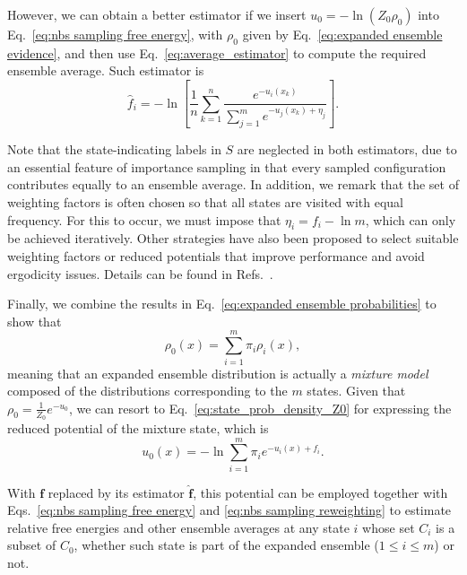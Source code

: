 \documentclass[aip,jcp,reprint,amsmath,amssymb]{revtex4-1}
\newcommand{\vt}[1]{\boldsymbol{\mathbf{#1}}}           %
\begin{document}
However, we can obtain a better estimator if we insert $u_0 = -\ln(Z_0\rho_0)$ into Eq.~\eqref{eq:nbs sampling free energy}, with $\rho_0$ given by Eq.~\eqref{eq:expanded ensemble evidence}, and then use Eq.~\eqref{eq:average_estimator} to compute the required ensemble average. Such estimator is
\begin{equation}
\label{eq:expanded ensemble FEP estimator}
\hat f_i = -\ln \left[ \frac{1}{n}\sum_{k=1}^n \frac{e^{-u_i(x_k)}}{\sum_{j=1}^m e^{-u_j(x_k) + \eta_j}} \right].
\end{equation}

Note that the state-indicating labels in $S$ are neglected in both estimators, due to an essential feature of importance sampling in that every sampled configuration contributes equally to an ensemble average. In addition, we remark that the set of weighting factors is often chosen so that all states are visited with equal frequency. For this to occur, we must impose that $\eta_i = f_i - \ln m$, which can only be achieved iteratively. Other strategies have also been proposed to select suitable weighting factors or reduced potentials that improve performance and avoid ergodicity issues. Details can be found in Refs.~.

Finally, we combine the results in Eq.~\eqref{eq:expanded ensemble probabilities} to show that
\begin{equation}
\label{eq:mixture ensemble}
\rho_0(x) = \sum_{i=1}^m \pi_i \rho_i(x),
\end{equation}
meaning that an expanded ensemble distribution is actually a \textit{mixture model}\cite{Lindsay_1995, Marin_2005} composed of the distributions corresponding to the $m$ states. Given that $\rho_0 = \frac{1}{Z_0}e^{-u_0}$, we can resort to Eq.~\eqref{eq:state_prob_density_Z0} for expressing the reduced potential of the mixture state, which is
\begin{equation}
\label{eq:expanded ensemble potential}
u_0(x) = -\ln \sum_{i=1}^m \pi_i e^{-u_i(x) + f_i}.
\end{equation}

With $\vt f$ replaced by its estimator $\hat{\vt f}$, this potential can be employed together with Eqs.~\eqref{eq:nbs sampling free energy} and \eqref{eq:nbs sampling reweighting} to estimate relative free energies and other ensemble averages at any state $i$ whose set $C_i$ is a subset of $C_0$, whether such state is part of the expanded ensemble ($1 \le i \le m$) or not.
\end{document}
